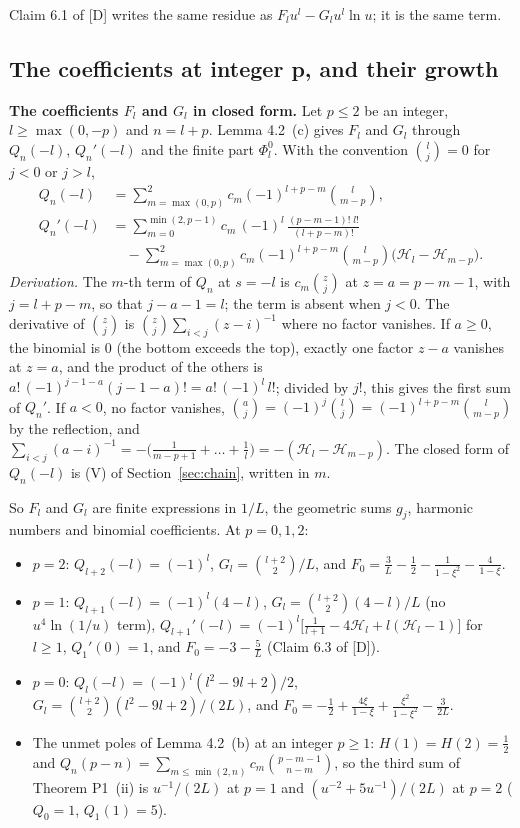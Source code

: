 \documentclass[11pt]{article}
\newcommand{\Har}{\mathcal{H}}
\begin{document}
Claim 6.1 of [D] writes the same residue as $F_lu^l-G_lu^l\ln u$; it is the same term.

\subsection{The coefficients at integer p, and their growth}\label{sec:coeff}

\noindent\textbf{The coefficients $F_l$ and $G_l$ in closed form.} Let $p\le2$ be an integer, $l\ge\max(0,-p)$ and $n=l+p$. Lemma 4.2~(c) gives $F_l$ and $G_l$ through $Q_n(-l)$, $Q_n'(-l)$ and the finite part $\Phi^0_l$. With the convention $\binom{l}{j}=0$ for $j<0$ or $j>l$,
\begin{align*}
Q_n(-l)&=\sum_{m=\max(0,p)}^{2}c_m(-1)^{l+p-m}\binom{l}{m-p},\\
Q_n'(-l)&=\sum_{m=0}^{\min(2,p-1)}c_m\,(-1)^l\,\frac{(p-m-1)!\;l!}{(l+p-m)!}\\
&\quad-\sum_{m=\max(0,p)}^{2}c_m(-1)^{l+p-m}\binom{l}{m-p}\bigl(\Har_l-\Har_{m-p}\bigr).
\end{align*}
\emph{Derivation.} The $m$-th term of $Q_n$ at $s=-l$ is $c_m\binom{z}{j}$ at $z=a=p-m-1$, with $j=l+p-m$, so that $j-a-1=l$; the term is absent when $j<0$. The derivative of $\binom{z}{j}$ is $\binom{z}{j}\sum_{i<j}(z-i)^{-1}$ where no factor vanishes. If $a\ge0$, the binomial is $0$ (the bottom exceeds the top), exactly one factor $z-a$ vanishes at $z=a$, and the product of the others is $a!\,(-1)^{j-1-a}(j-1-a)!=a!\,(-1)^l\,l!$; divided by $j!$, this gives the first sum of $Q_n'$. If $a<0$, no factor vanishes, $\binom{a}{j}=(-1)^j\binom{l}{j}=(-1)^{l+p-m}\binom{l}{m-p}$ by the reflection, and $\sum_{i<j}(a-i)^{-1}=-\bigl(\frac{1}{m-p+1}+\dots+\frac1l\bigr)=-(\Har_l-\Har_{m-p})$. The closed form of $Q_n(-l)$ is (V) of Section~\ref{sec:chain}, written in $m$.

So $F_l$ and $G_l$ are finite expressions in $1/L$, the geometric sums $g_j$, harmonic numbers and binomial coefficients. At $p=0,1,2$:
\begin{itemize}
\item $p=2$: $Q_{l+2}(-l)=(-1)^l$, $G_l=\binom{l+2}{2}/L$, and $F_0=\tfrac3L-\tfrac12-\tfrac{1}{1-\xi^2}-\tfrac{4}{1-\xi}$.
\item $p=1$: $Q_{l+1}(-l)=(-1)^l(4-l)$, $G_l=\binom{l+2}{2}(4-l)/L$ (no $u^4\ln(1/u)$ term), $Q_{l+1}'(-l)=(-1)^l\bigl[\frac{1}{l+1}-4\Har_l+l(\Har_l-1)\bigr]$ for $l\ge1$, $Q_1'(0)=1$, and $F_0=-3-\tfrac5L$ (Claim 6.3 of [D]).
\item $p=0$: $Q_l(-l)=(-1)^l(l^2-9l+2)/2$, $G_l=\binom{l+2}{2}(l^2-9l+2)/(2L)$, and $F_0=-\tfrac12+\tfrac{4\xi}{1-\xi}+\tfrac{\xi^2}{1-\xi^2}-\tfrac{3}{2L}$.
\item The unmet poles of Lemma 4.2~(b) at an integer $p\ge1$: $H(1)=H(2)=\frac12$ and $Q_n(p-n)=\sum_{m\le\min(2,n)}c_m\binom{p-m-1}{n-m}$, so the third sum of Theorem P1~(ii) is $u^{-1}/(2L)$ at $p=1$ and $(u^{-2}+5u^{-1})/(2L)$ at $p=2$ ($Q_0=1$, $Q_1(1)=5$).
\end{itemize}
\end{document}
